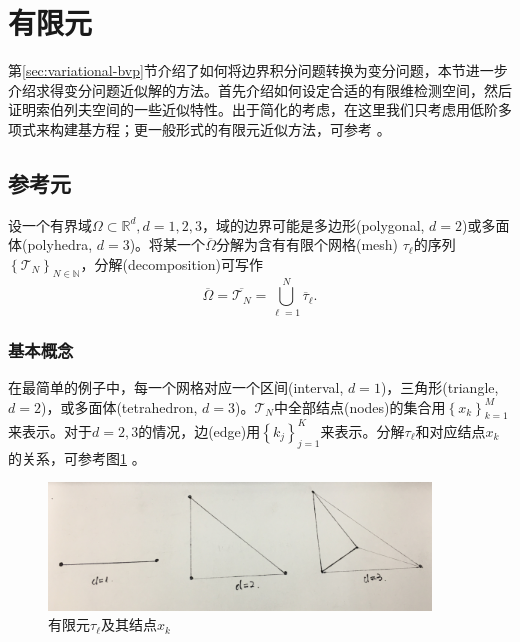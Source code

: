 \section{有限元}
\label{sec:finele}

第\ref{sec:variational-bvp}节介绍了如何将边界积分问题转换为变分问题，本节进一步介绍求得变分问题近似解的方法。首先介绍如何设定合适的有限维检测空间，然后证明索伯列夫空间的一些近似特性。出于简化的考虑，在这里我们只考虑用低阶多项式来构建基方程；更一般形式的有限元近似方法，可参考 \cite{Cheng:2005cd,Brenner:2008hf}。

\subsection{参考元}
\label{sec:finele-reference-elements}
设一个有界域$\Omega \subset \mathbb{R}^{d}, d=1,2,3$，域的边界可能是多边形(polygonal, $d=2$)或多面体(polyhedra, $d=3$)。将某一个$\overline{\Omega}$分解为含有有限个网格(mesh) $\tau_{\ell}$的序列$\left\{ \mathcal{T}_{N} \right\}_{N \in \mathbb{N}}$，分解(decomposition)可写作
\begin{equation}
  \label{eq:finele-ref-decomposition}
  \overline{\Omega} = \overline{\mathcal{T}_{N}} = \bigcup_{\ell = 1}^{N} \overline{\tau}_{\ell}.
\end{equation}

\subsubsection{基本概念}
在最简单的例子中，每一个网格对应一个区间(interval, $d=1$)，三角形(triangle, $d=2$)，或多面体(tetrahedron, $d=3$)。$\mathcal{T}_{N}$中全部结点(nodes)的集合用$\left\{ x_{k} \right\}_{k=1}^{M}$来表示。对于$d=2,3$的情况，边(edge)用$\left\{ k_{j} \right\}_{j=1}^{K}$来表示。分解$\tau_{\ell}$和对应结点$x_{k}$的关系，可参考图\ref{fig:finele-ref-element-nodes}
。

\begin{figure}[htbp]
  \centering
  \includegraphics[width=4in]{./Figures/20171209-finele-nodes}
 \caption{有限元$\tau_{\ell}$及其结点$x_{k}$}
\label{fig:finele-ref-element-nodes}

\end{figure}

